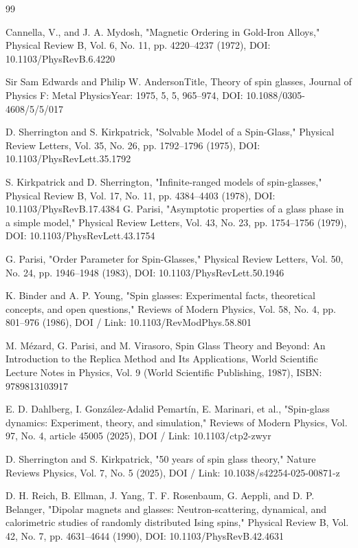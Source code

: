 \documentclass[
    aps,
    prb,
    reprint,           %
    superscriptaddress,%
    amsmath,amssymb,
    floatfix
]{revtex4-2}
\begin{document}
\begin{thebibliography}{99}

 Cannella, V., and J. A. Mydosh, "Magnetic Ordering in Gold-Iron Alloys," Physical Review B, Vol. 6, No. 11, pp. 4220–4237 (1972), DOI: 10.1103/PhysRevB.6.4220

 Sir Sam Edwards and Philip W. AndersonTitle, Theory of spin glasses, Journal of Physics F: Metal PhysicsYear: 1975, 5, 5, 965–974, DOI: 10.1088/0305-4608/5/5/017

 D. Sherrington and S. Kirkpatrick, "Solvable Model of a Spin-Glass," Physical Review Letters, Vol. 35, No. 26, pp. 1792–1796 (1975), DOI: 10.1103/PhysRevLett.35.1792

 S. Kirkpatrick and D. Sherrington, "Infinite-ranged models of spin-glasses," Physical Review B, Vol. 17, No. 11, pp. 4384–4403 (1978), DOI: 10.1103/PhysRevB.17.4384
 G. Parisi, "Asymptotic properties of a glass phase in a simple model," Physical Review Letters, Vol. 43, No. 23, pp. 1754–1756 (1979), DOI: 10.1103/PhysRevLett.43.1754

 G. Parisi, "Order Parameter for Spin-Glasses," Physical Review Letters, Vol. 50, No. 24, pp. 1946–1948 (1983), DOI: 10.1103/PhysRevLett.50.1946

 K. Binder and A. P. Young, "Spin glasses: Experimental facts, theoretical concepts, and open questions," Reviews of Modern Physics, Vol. 58, No. 4, pp. 801–976 (1986), DOI / Link: 10.1103/RevModPhys.58.801

 M. Mézard, G. Parisi, and M. Virasoro, Spin Glass Theory and Beyond: An Introduction to the Replica Method and Its Applications, World Scientific Lecture Notes in Physics, Vol. 9 (World Scientific Publishing, 1987), ISBN: 9789813103917

 E. D. Dahlberg, I. González-Adalid Pemartín, E. Marinari, et al., "Spin-glass dynamics: Experiment, theory, and simulation," Reviews of Modern Physics, Vol. 97, No. 4, article 45005 (2025), DOI / Link: 10.1103/ctp2-zwyr

 D. Sherrington and S. Kirkpatrick, "50 years of spin glass theory," Nature Reviews Physics, Vol. 7, No. 5 (2025), DOI / Link: 10.1038/s42254-025-00871-z

 D. H. Reich, B. Ellman, J. Yang, T. F. Rosenbaum, G. Aeppli, and D. P. Belanger, "Dipolar magnets and glasses: Neutron-scattering, dynamical, and calorimetric studies of randomly distributed Ising spins," Physical Review B, Vol. 42, No. 7, pp. 4631–4644 (1990), DOI: 10.1103/PhysRevB.42.4631


\end{thebibliography}
\end{document}

